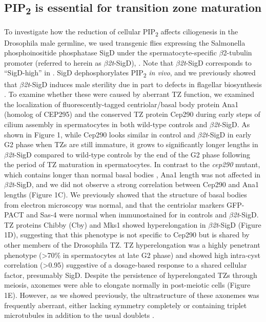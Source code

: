 \documentclass[12pt, twoside, letterpaper]{article}
\newcommand{\PIP}{PIP\textsubscript{2}}
\newcommand{\sigd}{$\beta$\textit{2t}-SigD}
\begin{document}
\begin{doublespacing}
\begin{linenumbers}
    \subsection{\PIP{} is essential for transition zone maturation}
    To investigate how the reduction of cellular \PIP{} affects ciliogenesis in the
    Drosophila male germline,
    we used transgenic flies expressing the Salmonella phosphoinositide phosphatase SigD
    under the spermatocyte-specific $\beta$2-tubulin promoter (referred to herein as \sigd{}),
    \citep{wei2008depletion}.
    Note that \sigd{} corresponds to ``SigD-high'' in \citep{fabian2010phosphatidylinositol}.
    SigD dephosphorylates \PIP{} \textit{in vivo},
    and we previously showed that \sigd{} induces male sterility
    due in part to defects in flagellar biosynthesis \citep{wei2008depletion}.
    To examine whether these were caused by aberrant TZ function,
    we examined the localization of fluorescently-tagged
    centriolar/basal body protein
    Ana1 (homolog of CEP295) \citep{goshima2007genes, blachon2009proximal}
    and the conserved TZ protein Cep290 \citep{basiri2014migrating}
    during early steps of cilium assembly in spermatocytes in both
    wild-type controls and \sigd{}.
    As shown in Figure 1,
    while Cep290 looks similar in control and \sigd{} in early G2 phase
    when TZs are still immature, 
    it grows to significantly longer lengths in \sigd{}
    compared to wild-type controls by the end of the G2 phase following
    the period of TZ maturation in spermatocytes.
    In contrast to the \textit{cep290} mutant, which contains
    longer than normal basal bodies \citep{basiri2014migrating},
    Ana1 length was not affected in \sigd{},
    and we did not observe a strong
    correlation between Cep290 and Ana1 lengths (Figure 1C).
    We previously showed that the structure of basal bodies
    from electron microscopy was normal, and that the centriolar
    markers GFP-PACT and Sas-4 \citep{basto2006flies}
    were normal when immunostained for
    in controls and \sigd{}.
    \citep{wei2008depletion}
    TZ proteins Chibby (Cby) \citep{enjolras2012drosophila} and
    Mks1 \citep{vieillard2016transition}
    showed hyperelongation in \sigd{} (Figure 1D),
    suggesting that this phenotype is not specific to Cep290 but is shared
    by other members of the Drosophila TZ.
    TZ hyperelongation was a highly penetrant phenotype (\textgreater 70\%
    in spermatocytes at late G2 phase)
    and showed high intra-cyst correlation (\textgreater 0.95) suggestive
    of a dosage-based response to a shared cellular factor,
    presumably SigD.
    Despite the persistence of hyperelongated TZs through meiosis,
    axonemes were able to
    elongate normally in post-meiotic cells (Figure 1E).
    However, as we showed previously, the ultrastructure of these axonemes
    was frequently aberrant,
    either lacking symmetry completely or containing triplet microtubules
    in addition to the usual doublets \citep{wei2008depletion}.


\end{linenumbers}
\end{doublespacing}
\end{document}
